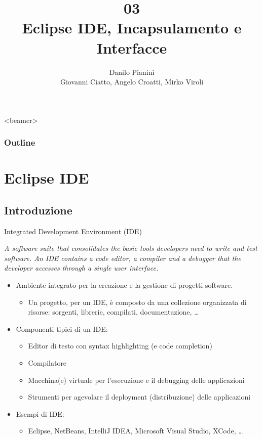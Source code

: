 \documentclass[presentation]{beamer}
\title[OOP03 -- Interfaces]{03\\Eclipse IDE, Incapsulamento e Interfacce}
\author[Pianini]{Danilo Pianini\\Giovanni Ciatto, Angelo Croatti, Mirko Viroli}
\begin{document}
	
\frame[label=coverpage]{\titlepage}

\begin{frame}<beamer>
	\frametitle{Outline}
	\tableofcontents[]
\end{frame}

\section{Eclipse IDE}
\subsection{Introduzione}

\begin{frame}{Integrated Development Environment (IDE)}
	\begin{block}{}
		\emph{A software suite that consolidates the basic tools developers need to write and test software. An IDE contains a code editor, a compiler and a debugger that the developer accesses through a single user interface.}
	\end{block}
	\begin{itemize}
		\item Ambiente integrato per la creazione e la gestione di progetti software.
		\begin{itemize}
			\item Un progetto, per un IDE, è composto da una collezione organizzata di risorse: sorgenti, librerie, compilati, documentazione, \dots
		\end{itemize}
		\item Componenti tipici di un IDE:
		\begin{itemize}
			\item Editor di testo con syntax highlighting (e code completion)
			\item Compilatore
			\item Macchina(e) virtuale per l'esecuzione e il debugging delle applicazioni
			\item Strumenti per agevolare il deployment (distribuzione) delle applicazioni
		\end{itemize}
		\item Esempi di IDE:
		\begin{itemize}
			\item Eclipse, NetBeans, IntelliJ IDEA, Microsoft Visual Studio, XCode, \dots
		\end{itemize}
	\end{itemize}
\end{frame}
\end{document}
